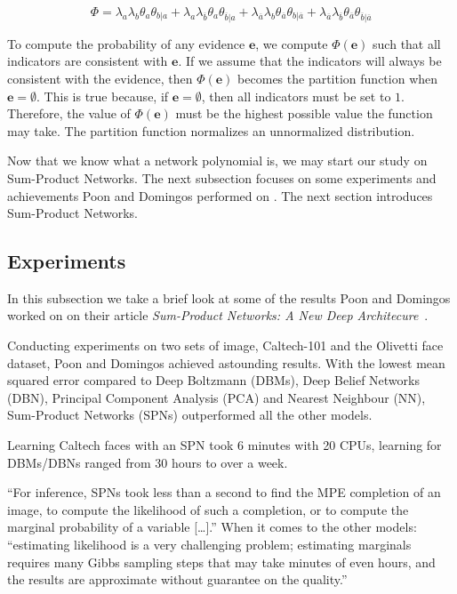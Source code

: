 \documentclass[a4paper,10pt]{article}
\theoremstyle{plain}
\begin{document}
\begin{equation}
  \Phi = \lambda_a\lambda_b\theta_a\theta_{b|a} +
      \lambda_a\lambda_{\overline{b}}\theta_a\theta_{\overline{b}|a} +
      \lambda_{\overline{a}}\lambda_b\theta_{\overline{a}}\theta_{b|\overline{a}} +
      \lambda_{\overline{a}}\lambda_{\overline{b}}\theta_{\overline{a}}\theta_{\overline{b}|\overline{a}}
\end{equation}

To compute the probability of any evidence $\mathbf{e}$, we compute $\Phi(\mathbf{e})$ such that
all indicators are consistent with $\mathbf{e}$. If we assume that the indicators will always be
consistent with the evidence, then $\Phi(\mathbf{e})$ becomes the partition function when
$\mathbf{e}=\emptyset$. This is true because, if $\mathbf{e}=\emptyset$, then all indicators must
be set to $1$. Therefore, the value of $\Phi(\mathbf{e})$ must be the highest possible value the
function may take. The partition function normalizes an unnormalized distribution.

Now that we know what a network polynomial is, we may start our study on Sum-Product Networks.
The next subsection focuses on some experiments and achievements Poon and Domingos performed on
\cite{poon-domingos}. The next section introduces Sum-Product Networks.

\subsection{Experiments}

In this subsection we take a brief look at some of the results Poon and Domingos worked on on their
article \textit{Sum-Product Networks: A New Deep Architecure}~\cite{poon-domingos}.

Conducting experiments on two sets of image, Caltech-101 and the Olivetti face dataset, Poon and
Domingos achieved astounding results. With the lowest mean squared error compared to Deep Boltzmann
(DBMs), Deep Belief Networks (DBN), Principal Component Analysis (PCA) and Nearest Neighbour (NN),
Sum-Product Networks (SPNs) outperformed all the other models.

Learning Caltech faces with an SPN took 6 minutes with 20 CPUs, learning for DBMs/DBNs ranged from
30 hours to over a week.\cite{poon-domingos}

``For inference, SPNs took less than a second to find the MPE completion of an image, to compute
the likelihood of such a completion, or to compute the marginal probability of a variable
[\ldots].'' When it comes to the other models: ``estimating likelihood is a very challenging
problem; estimating marginals requires many Gibbs sampling steps that may take minutes of even
hours, and the results are approximate without guarantee on the quality.''~\cite{poon-domingos}
\end{document}
